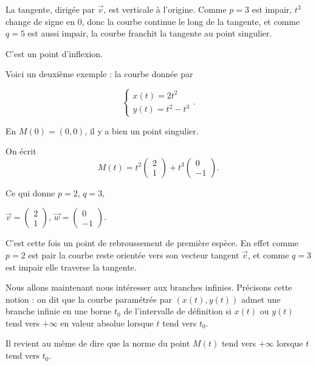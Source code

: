 La tangente, dirigée par $\overrightarrow{v}$, est verticale à l'origine.
Comme $p=3$ est impair, $t^3$ change de signe en $0$,
donc la courbe continue le long de la tangente, et comme $q=5$ est aussi
impair, la courbe franchit la tangente au point singulier.

\change
C'est un point d'inflexion.


\diapo

Voici un deuxième exemple : la courbe donnée par 

$$\left\{\begin{array}{l} x(t) = 2t^2\\ y(t) = t^2 - t^3\end{array}\right..$$

\change

\change
En $M(0)=(0,0)$, il y a bien un point singulier.

\change
On écrit
$$M(t) = t^2 \begin{pmatrix}2\\1\end{pmatrix} + t^3 
\begin{pmatrix}0\\-1\end{pmatrix}.$$

\change
Ce qui donne $p=2$, $q=3$, 

\change
$\overrightarrow{v}=\left(\begin{smallmatrix}2\\1\end{smallmatrix}\right)$,
$\overrightarrow{w}=\left(\begin{smallmatrix}0\\-1\end{smallmatrix}\right)$.

\change
C'est cette fois un point de rebroussement de première espèce. 
En effet comme $p=2$ est pair la courbe reste orientée vers 
son vecteur tangent $\overrightarrow{v}$, et comme $q=3$ 
est impair elle traverse la tangente.

\diapo

Nous allons maintenant nous intéresser aux branches infinies. 
Précisons cette notion : on dit que la courbe paramétrée
par $(x(t),y(t))$
admet une branche infinie en une borne $t_0$ de l'intervalle 
de définition si $x(t)$ ou $y(t)$ tend vers $+\infty$ en valeur 
absolue lorsque $t$ tend vers $t_0$. 

Il revient au même de dire que la norme du point $M(t)$ 
tend vers $+\infty$  lorsque $t$ tend vers $t_0$.

